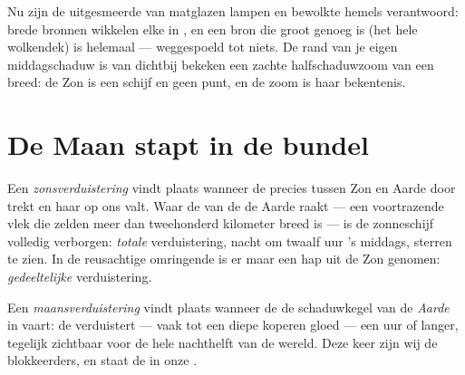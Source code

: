 \begin{example}\label{ex:g7:shadows-eclipses:soft}
Nu zijn de uitgesmeerde  van matglazen lampen en bewolkte
hemels verantwoord: brede bronnen wikkelen elke  in
, en een bron die groot genoeg is (het hele wolkendek) is
helemaal  ---  weggespoeld tot niets. De rand
van je eigen middagschaduw is van dichtbij bekeken een zachte
halfschaduwzoom van een  breed: de Zon is een schijf en geen
punt, en de zoom is haar bekentenis.
\end{example}

\section{De Maan stapt in de bundel}

\begin{definition}[Zonsverduistering]\label{def:g7:shadows-eclipses:solar}
Een \emph{zonsverduistering} vindt plaats
wanneer de  precies tussen Zon en Aarde door trekt en haar
 op ons valt. Waar de \emph{} van de
 de Aarde raakt --- een voortrazende vlek die zelden meer dan
tweehonderd kilometer breed is --- is de zonneschijf volledig
verborgen: \emph{totale} verduistering, nacht om twaalf uur 's
middags, sterren te zien. In de reusachtige omringende
\emph{} is er maar een hap uit de Zon genomen:
\emph{gedeeltelijke} verduistering.
\end{definition}

\begin{definition}[Maansverduistering]\label{def:g7:shadows-eclipses:lunar}
Een \emph{maansverduistering} vindt plaats
wanneer de \emph{} de schaduwkegel van de \emph{Aarde} in vaart:
de  verduistert --- vaak tot een diepe koperen gloed ---
een uur of langer, tegelijk zichtbaar voor de hele nachthelft van de
wereld. Deze keer zijn wij de blokkeerders, en staat de  in
onze .
\end{definition}

